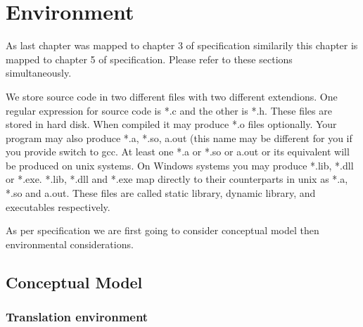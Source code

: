 


\chapter{Environment}
\startcolumns[n=3,distance=2em]
  \placelist
    [section]
    [alternative=c, %
     interaction=all,]
\stopcolumns
As last chapter was mapped to chapter 3 of specification similarily
this chapter is mapped to chapter 5 of specification. Please refer to
these sections simultaneously.

We store source code in two different files with two different
extendions. One regular expression for source code is *.c and the
other is *.h. These files are stored in hard disk. When compiled it
may produce *.o files optionally. Your program may also produce *.a,
*.so, a.out (this name may be different for you if you provide
 switch to gcc. At least one *.a or *.so or a.out or its
equivalent will be produced on unix systems. On Windows systems you
may produce *.lib, *.dll or *.exe. *.lib, *.dll and *.exe map directly
to their counterparts in unix as *.a, *.so and a.out. These files are
called static library, dynamic library, and executables respectively.

As per specification we are first going to consider conceptual model
then environmental considerations.

\section{Conceptual Model}
\subsection{Translation environment}
